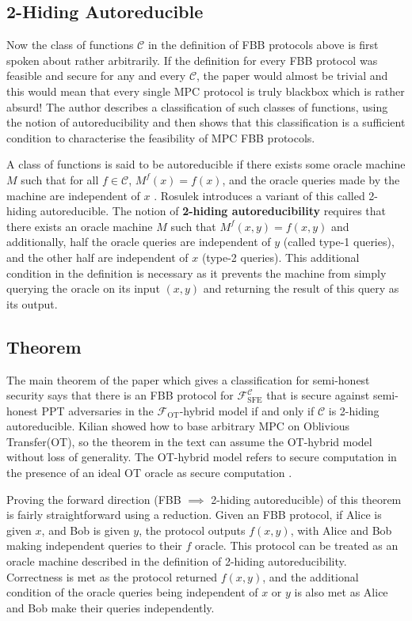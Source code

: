 \documentclass[11pt]{article}
\theoremstyle{theorem}
\theoremstyle{theorem}
\theoremstyle{remark}
\theoremstyle{note}
\theoremstyle{plain}
\theoremstyle{definition}
\begin{document}
\subsection{2-Hiding Autoreducible}
Now the class of functions $\mathcal{C}$ in the definition of FBB protocols above is first spoken about rather arbitrarily. If the definition for every FBB protocol was feasible and secure for any and every  $\mathcal{C}$, the paper would almost be trivial and this would mean that every single MPC protocol is truly blackbox which is rather absurd! The author describes a classification of such classes of functions, using the notion of autoreducibility and then shows that this classification is a sufficient condition to characterise the feasibility of MPC FBB protocols.

A class of functions is said to be autoreducible if there exists some oracle machine $M$ such that for all $f \in \mathcal{C}$, $M^{f}(x) = f(x)$, and the oracle queries made by the machine are independent of $x$ \cite{FOCS:BuhForTor95}. Rosulek introduces a variant of this called 2-hiding autoreducible. The notion of \textbf{2-hiding autoreducibility} requires that there exists an oracle machine $M$ such that $M^{f}(x,y) = f(x,y)$ and additionally, half the oracle queries are independent of $y$ (called type-1 queries), and the other half are independent of $x$ (type-2 queries). This additional condition in the definition is necessary as it prevents the machine from simply querying the oracle on its input $(x,y)$ and returning the result of this query as its output.

\subsection{Theorem}
The main theorem of the paper which gives a classification for semi-honest security says that there is an FBB protocol for $\mathcal{F}^\mathcal{C}_\text{SFE}$ that is secure against semi-honest PPT adversaries in the $\mathcal{F}_\text{OT}$-hybrid model if and only if $\mathcal{C}$ is 2-hiding autoreducible. Kilian \cite{STOC:Kilian88} showed how to base arbitrary MPC on Oblivious Transfer(OT), so the theorem in the text can assume the OT-hybrid model without loss of generality. The OT-hybrid model refers to secure computation in the presence of an ideal OT oracle as secure computation \cite{C:IshPraSah08}.

Proving the forward direction (FBB $\implies$ 2-hiding autoreducible) of this theorem is fairly straightforward using a reduction. Given an FBB protocol, if Alice is given $x$, and Bob is given $y$, the protocol outputs $f(x,y)$, with Alice and Bob making independent queries to their $f$ oracle. This protocol can be treated as an oracle machine described in the definition of 2-hiding autoreducibility. Correctness is met as the protocol returned $f(x,y)$, and the additional condition of the oracle queries being independent of $x$ or $y$ is also met as Alice and Bob make their queries independently.
\end{document}
